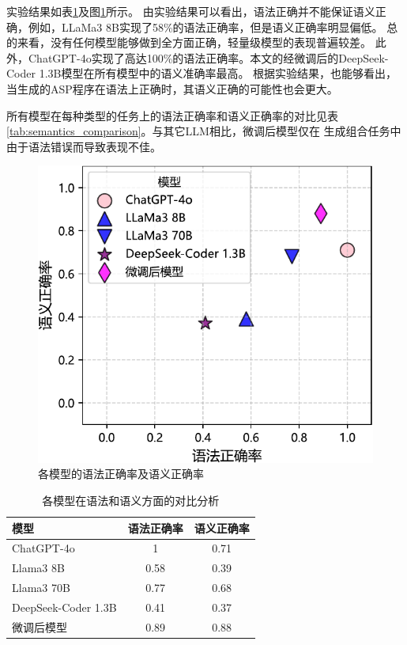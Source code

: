 实验结果如表\ref{fig:overall_syntactics_semantics}及图\ref{fig:syntactics_and_semantics}所示。
由实验结果可以看出，语法正确并不能保证语义正确，例如，LLaMa3 8B实现了58\%的语法正确率，但是语义正确率明显偏低。
总的来看，没有任何模型能够做到全方面正确，轻量级模型的表现普遍较差。
此外，ChatGPT-4o实现了高达100\%的语法正确率。本文的经微调后的DeepSeek-Coder 1.3B模型在所有模型中的语义准确率最高。
根据实验结果，也能够看出，当生成的ASP程序在语法上正确时，其语义正确的可能性也会更大。

所有模型在每种类型的任务上的语法正确率和语义正确率的对比见表\ref{tab:semantics_comparison}。与其它LLM相比，微调后模型仅在
生成组合任务中由于语法错误而导致表现不佳。
\begin{figure}
    \centering
    \includegraphics{figures/synatics_and_semantics-crop.pdf}
    \caption{各模型的语法正确率及语义正确率}
    \label{fig:syntactics_and_semantics}
\end{figure}
\begin{table}
    \centering
    \begin{tabular}{lcc}
        \toprule
        \textbf{模型} & \textbf{语法正确率} & \textbf{语义正确率} \\
        \midrule
        ChatGPT-4o & 1 & 0.71 \\
        Llama3 8B & 0.58 & 0.39 \\
        Llama3 70B & 0.77 & 0.68 \\
        DeepSeek-Coder 1.3B & 0.41 & 0.37 \\
        \midrule
        微调后模型 & 0.89 & 0.88 \\
        \bottomrule
    \end{tabular}
    \caption{各模型在语法和语义方面的对比分析}
    \label{fig:overall_syntactics_semantics}
\end{table}
